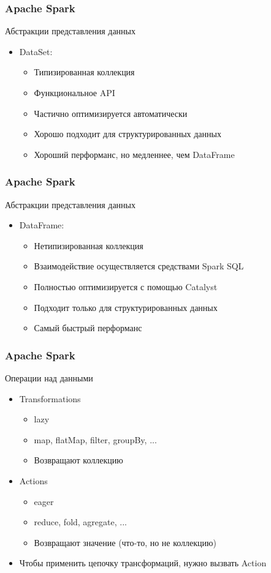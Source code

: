 \documentclass{beamer}
\begin{document}
\begin{frame}\frametitle{Apache Spark}
Абстракции представления данных
\begin{itemize}
    \item DataSet: 
    \begin{itemize}
        \item Типизированная коллекция
        \item Функциональное API
        \item Частично оптимизируется автоматически
        \item Хорошо подходит для структурированных данных
        \item Хороший перформанс, но медленнее, чем DataFrame
    \end{itemize}
\end{itemize}
\end{frame}

\begin{frame}\frametitle{Apache Spark}
Абстракции представления данных
\begin{itemize}
    \item DataFrame: 
    \begin{itemize}
        \item Нетипизированная коллекция
        \item Взаимодействие осуществляется средствами Spark SQL
        \item Полностью оптимизируется с помощью Catalyst
        \item Подходит только для структурированных данных
        \item Самый быстрый перформанс
    \end{itemize}
\end{itemize}
\end{frame}

\begin{frame}\frametitle{Apache Spark}
Операции над данными
\begin{itemize}
    \item Transformations 
    \begin{itemize}
        \item lazy
        \item map, flatMap, filter, groupBy, ...
        \item Возвращают коллекцию
    \end{itemize}
    \item Actions
    \begin{itemize}
        \item eager
        \item reduce, fold, agregate, ...
        \item Возвращают значение (что-то, но не коллекцию)
    \end{itemize}
    \item Чтобы применить цепочку трансформаций, нужно вызвать Action
\end{itemize}
\end{frame}
\end{document}
